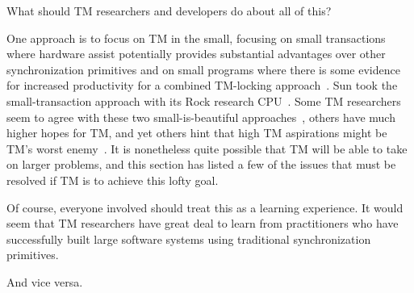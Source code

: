 What should TM researchers and developers do about all of this?

One approach is to focus on TM in the small, focusing on small
transactions where hardware assist potentially provides substantial
advantages over other synchronization primitives and on small programs
where there is some evidence for increased productivity for a combined
TM-locking approach~\cite{VPankratius2011TMvsLockingProductivity}.
Sun took the small-transaction approach with its Rock research
CPU~\cite{DaveDice2009ASPLOSRockHTM}.
Some TM researchers seem to agree with these two small-is-beautiful
approaches~\cite{JMStone93}, others have much higher hopes for TM, and yet others
hint that high TM aspirations might be TM's worst
enemy~\cite[Section 6]{Attiya:2010:ICT:1835698.1835699}.
It is nonetheless quite possible that TM will be able to take on larger
problems, and this section has listed a few of the issues that must be
resolved if TM is to achieve this lofty goal.

Of course, everyone involved should treat this as a learning experience.
It would seem that TM researchers have great deal to learn from
practitioners who have successfully built large software systems using
traditional synchronization primitives.

And vice versa.

\QuickQuizEnd

